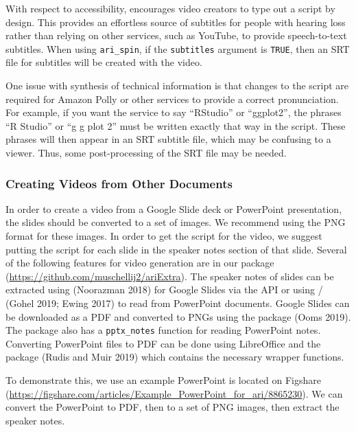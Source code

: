 With respect to accessibility,  encourages video creators to
type out a script by design. This provides an effortless source of
subtitles for people with hearing loss rather than relying on other
services, such as YouTube, to provide speech-to-text subtitles. When
using \texttt{ari\_spin}, if the \texttt{subtitles} argument is
\texttt{TRUE}, then an SRT file for subtitles will be created with the
video.

One issue with synthesis of technical information is that changes to the
script are required for Amazon Polly or other services to provide a
correct pronunciation. For example, if you want the service to say
``RStudio'' or ``ggplot2'', the phrases ``R Studio'' or ``g g plot 2''
must be written exactly that way in the script. These phrases will then
appear in an SRT subtitle file, which may be confusing to a viewer.
Thus, some post-processing of the SRT file may be needed.

\hypertarget{creating-videos-from-other-documents}{%
\subsubsection{Creating Videos from Other
Documents}\label{creating-videos-from-other-documents}}

In order to create a video from a Google Slide deck or PowerPoint
presentation, the slides should be converted to a set of images. We
recommend using the PNG format for these images. In order to get the
script for the video, we suggest putting the script for each slide in
the speaker notes section of that slide. Several of the following
features for video generation are in our package 
(\url{https://github.com/muschellij2/ariExtra}). The speaker notes of
slides can be extracted using  (Noorazman 2018)
for Google Slides via the API or using
/ (Gohel 2019; Ewing 2017) to read
from PowerPoint documents. Google Slides can be downloaded as a PDF and
converted to PNGs using the  package (Ooms 2019). The
 package also has a \texttt{pptx\_notes} function for
reading PowerPoint notes. Converting PowerPoint files to PDF can be done
using LibreOffice and the  package (Rudis and Muir
2019) which contains the necessary wrapper functions.

To demonstrate this, we use an example PowerPoint is located on Figshare
(\url{https://figshare.com/articles/Example_PowerPoint_for_ari/8865230}).
We can convert the PowerPoint to PDF, then to a set of PNG images, then
extract the speaker notes.

